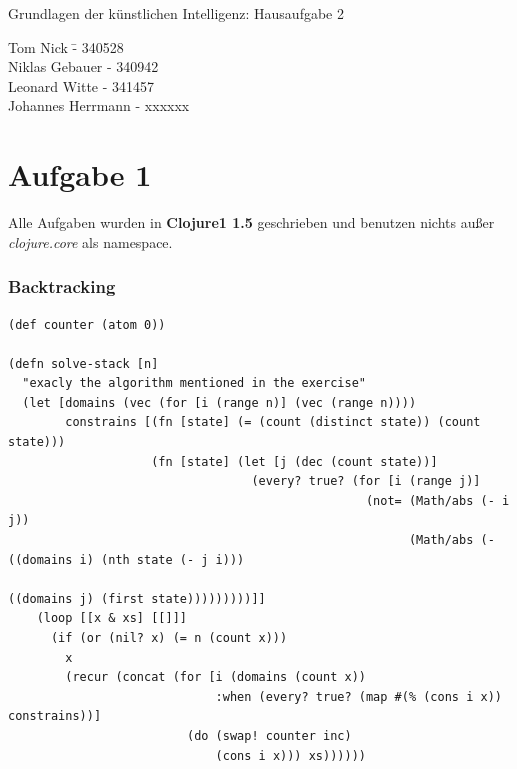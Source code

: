\documentclass[a4paper,10pt]{article}
\begin{document}
\begin{center}
\Large{Grundlagen der künstlichen Intelligenz: Hausaufgabe 2} \\
\end{center}
\begin{tabbing}
Tom Nick \hspace{2cm}\= - 340528\\
Niklas Gebauer \> - 340942 \\
Leonard Witte \> - 341457 \\
Johannes Herrmann \> - xxxxxx\\
\end{tabbing}

\section*{Aufgabe 1}

Alle Aufgaben wurden in \textbf{Clojure1 1.5} geschrieben und benutzen nichts außer \textit{clojure.core} als namespace.
\subsubsection*{Backtracking}
\begin{lstlisting}
(def counter (atom 0))

(defn solve-stack [n]
  "exacly the algorithm mentioned in the exercise"
  (let [domains (vec (for [i (range n)] (vec (range n))))
        constrains [(fn [state] (= (count (distinct state)) (count state)))
                    (fn [state] (let [j (dec (count state))]
                                  (every? true? (for [i (range j)]
                                                  (not= (Math/abs (- i j))
                                                        (Math/abs (- ((domains i) (nth state (- j i)))
                                                                     ((domains j) (first state)))))))))]]
    (loop [[x & xs] [[]]]
      (if (or (nil? x) (= n (count x)))
        x
        (recur (concat (for [i (domains (count x))
                             :when (every? true? (map #(% (cons i x)) constrains))]
                         (do (swap! counter inc)
                             (cons i x))) xs))))))
\end{lstlisting}
\end{document}
